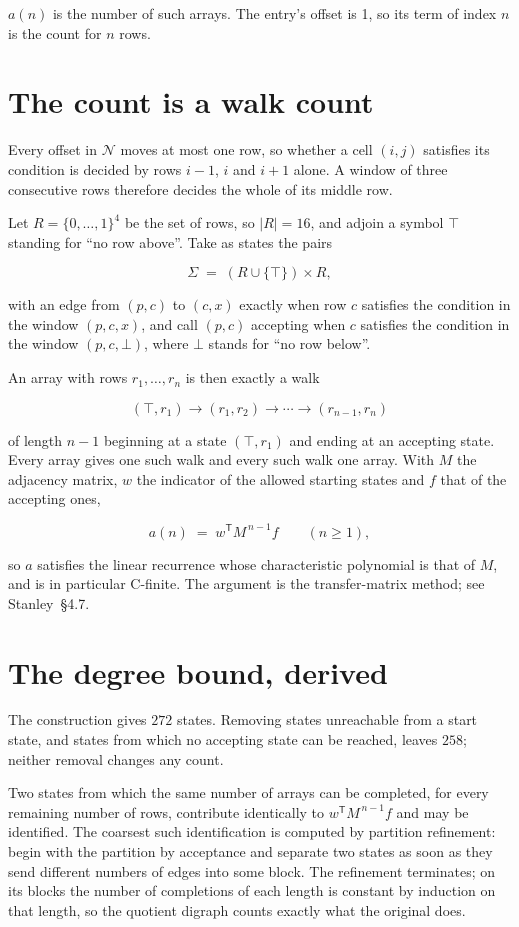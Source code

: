\documentclass[11pt]{article}
\theoremstyle{definition}
\begin{document}
$a(n)$ is the number of such arrays. The entry's offset is 1, so its term of index $n$ is the count for $n$ rows.

\section{The count is a walk count}

Every offset in $\mathcal{N}$ moves at most one row, so whether a cell $(i,j)$ satisfies its condition is decided by rows $i-1$, $i$ and $i+1$ alone. A window of three consecutive rows therefore decides the whole of its middle row.

Let $R = \{0,\dots,1\}^{4}$ be the set of rows, so $|R| = 16$, and adjoin a symbol $\top$ standing for ``no row above''. Take as states the pairs

\[\Sigma \;=\; (R \cup \{\top\}) \times R,\]

with an edge from $(p,c)$ to $(c,x)$ exactly when row $c$ satisfies the condition in the window $(p,c,x)$, and call $(p,c)$ accepting when $c$ satisfies the condition in the window $(p,c,\bot)$, where $\bot$ stands for ``no row below''.

An array with rows $r_1,\dots,r_n$ is then exactly a walk

\[(\top,r_1) \to (r_1,r_2) \to \cdots \to (r_{n-1},r_n)\]

of length $n-1$ beginning at a state $(\top,r_1)$ and ending at an accepting state. Every array gives one such walk and every such walk one array. With $M$ the adjacency matrix, $w$ the indicator of the allowed starting states and $f$ that of the accepting ones,

\[a(n) \;=\; w^{\mathsf T} M^{\,n-1} f \qquad (n \ge 1),\]

so $a$ satisfies the linear recurrence whose characteristic polynomial is that of $M$, and is in particular C-finite. The argument is the transfer-matrix method; see Stanley~\S4.7.

\section{The degree bound, derived}

The construction gives $272$ states. Removing states unreachable from a start state, and states from which no accepting state can be reached, leaves $258$; neither removal changes any count.

Two states from which the same number of arrays can be completed, for every remaining number of rows, contribute identically to $w^{\mathsf T}M^{\,n-1}f$ and may be identified. The coarsest such identification is computed by partition refinement: begin with the partition by acceptance and separate two states as soon as they send different numbers of edges into some block. The refinement terminates; on its blocks the number of completions of each length is constant by induction on that length, so the quotient digraph counts exactly what the original does.
\end{document}
